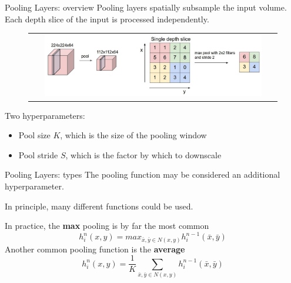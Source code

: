\documentclass[aspectratio=169]{beamer}
\begin{document}

\begin{frame}{Pooling Layers: overview}
Pooling layers spatially subsample the input volume.\\
Each depth slice of the input is processed independently.\\
\begin{figure}
\begin{tabular}{c}
\includegraphics[width=0.90\textwidth]{img/cnn/pool.jpg}
\end{tabular}
\end{figure}
Two hyperparameters:
\begin{itemize}
\item Pool size $K$, which is the size of the pooling window
\item Pool stride $S$, which is the factor by which to downscale
\end{itemize}
\end{frame}


\begin{frame}{Pooling Layers: types}
The pooling function may be considered an additional hyperparameter.

In principle, many different functions could be used.

In practice, the \textbf{max} pooling is by far the most common
\begin{equation*}
h^n_i(x, y) = max_{\bar{x},\bar{y} \in N(x, y)}h^{n-1}_{i}(\bar{x},\bar{y})
\end{equation*}
Another common pooling function is the \textbf{average}
\begin{equation*}
h^n_i(x, y) = \frac{1}{K}\sum_{\bar{x},\bar{y} \in N(x, y)}h^{n-1}_{i}(\bar{x},\bar{y})
\end{equation*}
\end{frame}
\end{document}
